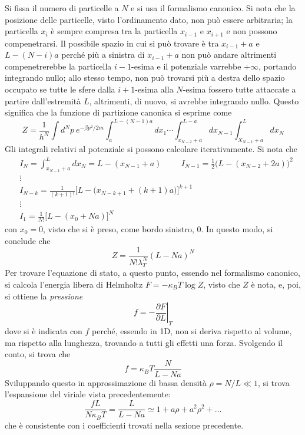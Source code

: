 \documentclass[11pt, a4paper]{scrartcl}
\theoremstyle{style}
\theoremstyle{style1}
\newcommand*\Eval[3]{\left.#1\right\rvert_{#2}^{#3}}
\numberwithin{equation}{subsection}
\begin{document}
Si fissa il numero di particelle a $N$ e si usa il formalismo canonico. 
Si nota che la posizione delle particelle, visto l'ordinamento dato, non pu\`o essere arbitraria; la particella $x_i$ \`e sempre compresa tra la particella $x_{i-1} $ e $x_{i+1} $ e non possono compenetrarsi. 
Il possibile spazio in cui si pu\`o trovare \`e tra $x_{i-1} +a$ e $L-(N-i)a$ perch\'e pi\`u a sinistra di $x_{i-1} +a$ non pu\`o andare altrimenti compenetrerebbe la particella $i-1$-esima e il potenziale varrebbe $+\infty$, portando integrando nullo; allo stesso tempo, non pu\`o trovarsi pi\`u a destra dello spazio occupato se tutte le sfere dalla $i+1$-esima alla $N$-esima fossero tutte attaccate a partire dall'estremit\`a $L$, altrimenti, di nuovo, si avrebbe integrando nullo. 
Questo significa che la funzione di partizione canonica si esprime come
\[
Z  = \frac{1}{h^N} \int d^N p \ e^{-\beta  p^2 / 2m} \int_{a} ^{L-(N-1)a} dx_1 \cdots \int_{x_{N-2} +a} ^{L-a} dx_{N-1} \int_{X_{N-1} +a} ^L dx_N
\] 
Gli integrali relativi al potenziale si possono calcolare iterativamente.
Si nota che 
\[
	\begin{split}
		&I_N = \int_{x_{N-1} +a} ^L dx_N = L-(x_{N-1} +a) \hspace{1cm} I_{N-1} = \frac{1}{2} \big(L - (x_{N-2} +2a)\big) ^2\\
		&\vdots\\
		& I_{N-k} = \frac{1}{(k+1)!}\Big[L-\big(x_{N-k+1} +(k+1)a\big)\Big]^{k+1} \\
		&\vdots\\
		&I_1 = \frac{1}{N!}\big[L-(x_0+Na)\big]^N
	\end{split}
\] 
con $x_0=0$, visto che si \`e preso, come bordo sinistro, $0$.
In questo modo, si conclude che 
\[
Z = \frac{1}{N!\lambda _T^N}(L-Na)^N
\] 
Per trovare l'equazione di stato, a questo punto, essendo nel formalismo canonico, si calcola l'energia libera di Helmholtz $F = -\kappa _B T \log Z$, visto che $Z$ \`e nota, e, poi, si ottiene la \textit{pressione} 
\[
	f = -\Eval{\frac{\partial F}{\partial L} }{T}{}
\] 
dove si \`e indicata con $f$ perch\'e, essendo in 1D, non si deriva rispetto al volume, ma rispetto alla lunghezza, trovando a tutti gli effetti una forza.
Svolgendo il conto, si trova che 
\[
f = \kappa _B T \frac{N}{L-Na}
\] 
Sviluppando questo in approssimazione di bassa densit\`a $\rho = N / L \ll 1$, si trova l'espansione del viriale vista precedentemente:
\[
\frac{fL}{N\kappa _B T}= \frac{L}{L-Na}\simeq 1 + a \rho  + a^2 \rho ^2 + \ldots
\] 
che \`e consistente con i coefficienti trovati nella sezione precedente.
\end{document}
